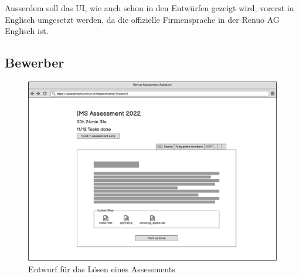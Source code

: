 Ausserdem soll das UI, wie auch schon in den Entwürfen gezeigt wird, vorerst in Englisch umgesetzt werden, da die  offizielle Firmensprache
in der Renuo AG Englisch ist.

\subsection{Bewerber}
\begin{figure}[H]
    \centering
    \includegraphics[width=12cm]{images/mockups/candidate-solve-assessment.png}
    \caption{\label{fig:mockup-candidate-solve-assessment}Entwurf für das Lösen eines Assessments}
\end{figure}

